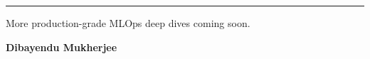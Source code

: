 \documentclass[11pt]{article}
\begin{document}
\vfill

\begin{center}
    \rule{0.6\textwidth}{0.5pt}
    
    \vspace{0.15in}
    
    {\fontsize{11}{13}\selectfont\color{brandgray}
    More production-grade MLOps deep dives coming soon.
    }
    
    \vspace{0.12in}
    
    {\fontsize{14}{16}\selectfont\color{brandnavy}\textbf{Dibayendu Mukherjee}}
\end{center}

\vspace*{0.2in}

\newpage
\end{document}
